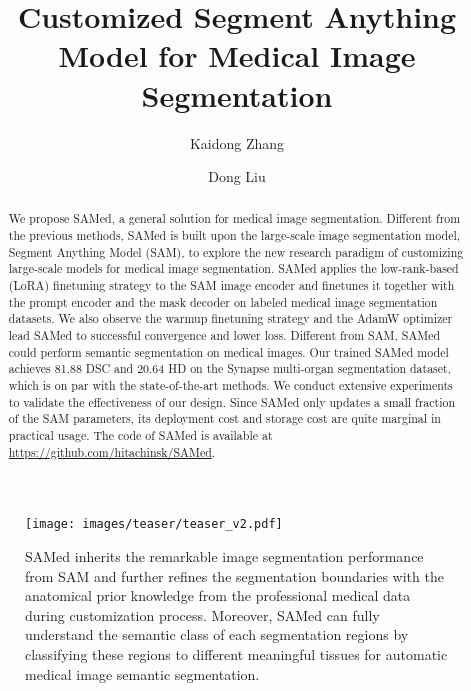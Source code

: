 \documentclass[runningheads]{llncs}
\begin{document}
\title{Customized Segment Anything Model for Medical Image Segmentation}
\author{Kaidong Zhang \and
Dong Liu}
\maketitle              \begin{abstract}
We propose SAMed, a general solution for medical image segmentation. Different from the previous methods, SAMed is built upon the large-scale image segmentation model, Segment Anything Model (SAM), to explore the new research paradigm of customizing large-scale models for medical image segmentation. SAMed applies the low-rank-based (LoRA) finetuning strategy to the SAM image encoder and finetunes it together with the prompt encoder and the mask decoder on labeled medical image segmentation datasets. We also observe the warmup finetuning strategy and the AdamW optimizer lead SAMed to successful convergence and lower loss. Different from SAM, SAMed could perform semantic segmentation on medical images. Our trained SAMed model achieves 81.88 DSC and 20.64 HD on the Synapse multi-organ segmentation dataset, which is on par with the state-of-the-art methods. We conduct extensive experiments to validate the effectiveness of our design. Since SAMed only updates a small fraction of the SAM parameters, its deployment cost and storage cost are quite marginal in practical usage. The code of SAMed is available at \url{https://github.com/hitachinsk/SAMed}.

\end{abstract}


\begin{figure*}[t]
\begin{center}
\texttt{[image: images/teaser/teaser\_v2.pdf]}
\end{center}
   \caption{SAMed inherits the remarkable image segmentation performance from SAM and further refines the segmentation boundaries with the anatomical prior knowledge from the professional medical data during customization process. Moreover, SAMed can fully understand the semantic class of each segmentation regions by classifying these regions to different meaningful tissues for automatic medical image semantic segmentation.}
\label{fig:teaser}
\end{figure*}
\end{document}
